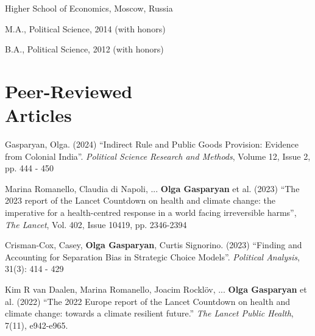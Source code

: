 \documentclass[margin,line,10.95pt]{res}
\newenvironment{list1}{
  \begin{list}{\ding{113}}{%
      \setlength{\itemsep}{0in}
      \setlength{\parsep}{0in} \setlength{\parskip}{0in}
      \setlength{\topsep}{0in} \setlength{\partopsep}{0in}
      \setlength{\leftmargin}{0.17in}}}{\end{list}}
\begin{document}
\begin{resume}
\vspace{-3mm}
{Higher School of Economics, Moscow, Russia}\\
\vspace*{-.1in}
\begin{list1}
 \item[] M.A., Political Science, 2014 (with honors) 
\item[] B.A., Political Science, 2012 (with honors)
\end{list1}



\section{\sc Peer-Reviewed \\ Articles}
Gasparyan, Olga. (2024) ``Indirect Rule and Public Goods Provision: Evidence from Colonial India''. \textit{Political Science Research and Methods}, Volume 12, Issue 2, pp. 444 - 450


\vspace*{-2.5mm}

Marina Romanello, Claudia di Napoli, ... \textbf{Olga Gasparyan} et al. (2023) ``The 2023 report of the Lancet Countdown on health and climate change: the imperative for a health-centred response in a world facing irreversible harms'', \textit{The Lancet},  Vol. 402, Issue 10419, pp. 2346-2394  


\vspace*{-2.5mm}

Crisman-Cox, Casey, \textbf{Olga Gasparyan}, Curtis Signorino. (2023) ``Finding and Accounting for Separation Bias in Strategic Choice Models''. \textit{Political Analysis}, 31(3): 414 - 429

\vspace*{-2.5mm}

Kim R van Daalen, Marina Romanello, Joacim Rocklöv, ... \textbf{Olga Gasparyan} et al. (2022) ``The 2022 Europe report of the Lancet Countdown on health and climate change: towards a climate resilient future.'' \textit{The Lancet Public Health}, 7(11), e942-e965.



\end{resume}
\end{document}
